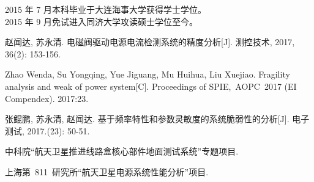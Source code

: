 2015 年 7 月本科毕业于大连海事大学获得学士学位。\\
2015 年 9 月免试进入同济大学攻读硕士学位至今。

\begin{enumerate}[{[}1{]}]
\item 赵闻达, 苏永清. 电磁阀驱动电源电流检测系统的精度分析[J]. 测控技术, 2017, 36(2): 153-156.
\item Zhao Wenda, Su Yongqing, Yue Jiguang, Mu Huihua, Liu Xuejiao. Fragility analysis and weak of power system[C].
 Proceedings of SPIE,~AOPC~2017 (EI Compendex). 2017:23.
\item 张鲲鹏, 苏永清, 赵闻达. 基于频率特性和参数灵敏度的系统脆弱性的分析[J]. 电子测试, 2017.(23): 50-51.

\end{enumerate}

\begin{enumerate}[{[}1{]}]
\item 中科院“航天卫星推进线路盒核心部件地面测试系统”专题项目.
\item 上海第~811~研究所“航天卫星电源系统性能分析”项目.
\end{enumerate}
